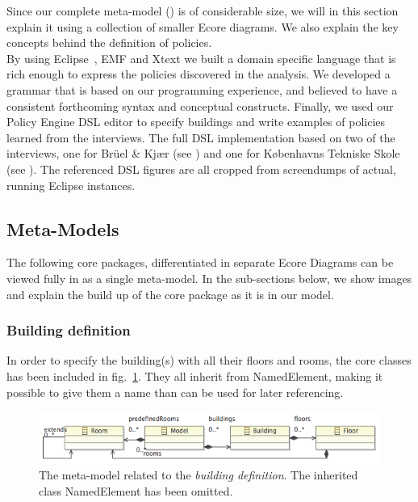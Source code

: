 Since our complete meta-model () is of considerable size, we will in this section explain it using a collection of smaller Ecore diagrams. We also explain the key concepts behind the definition of policies.\\
 
By using Eclipse~\cite{eclipse}, EMF and Xtext we built a domain specific language that is rich enough to express the policies discovered in the analysis. We developed a grammar that is based on our programming experience, and believed to have a consistent forthcoming syntax and conceptual constructs. Finally, we used our Policy Engine DSL editor to specify buildings and write examples of policies learned from the interviews. The full DSL implementation based on two of the interviews, one for Br\"{u}el \& Kj\ae r (see ) and one for K\o benhavns Tekniske Skole (see ). The referenced DSL figures are all cropped from screendumps of actual, running Eclipse instances.

\subsection{Meta-Models}

The following core packages, differentiated in separate Ecore Diagrams can be viewed fully in  as a single meta-model. In the sub-sections below, we show images and explain the build up of the core package as it is in our model. 

\subsubsection{Building definition}
In order to specify the building(s) with all their floors and rooms, the core classes has been included in fig. \ref{fig:ecore-building-definition}. They all inherit from NamedElement, making it possible to give them a name than can be used for later referencing.
\begin{figure}[h]
  \centering \includegraphics[scale=.5]{ecore-building-definition.png}  
	\caption{The meta-model related to the \textit{building definition}. The inherited class NamedElement has been omitted.}
	\label{fig:ecore-building-definition}
\end{figure}

